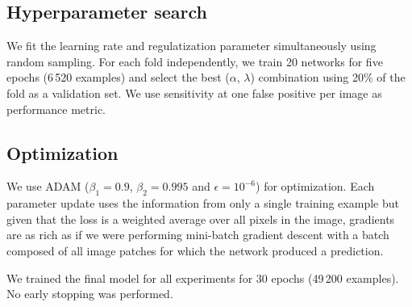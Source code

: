 \subsection{Hyperparameter search}
\label{subsec:Hyperparameters}
We fit the learning rate and regulatization parameter simultaneously using random sampling. For each fold independently, we train 20 networks for five epochs (6\,520 examples) and select the best ($\alpha$, $\lambda$) combination using 20\% of the fold as a validation set. We use sensitivity at one false positive per image as performance metric.

\subsection{Optimization}
We use ADAM ($\beta_1 = 0.9$, $\beta_2 = 0.995$ and $\epsilon = 10^{-6}$) for optimization.
Each parameter update uses the information from only a single training example but given that the loss is a weighted average over all pixels in the image, gradients are as rich as if we were performing mini-batch gradient descent with a batch composed of all image patches for which the network produced a prediction.

We trained the final model for all experiments for 30 epochs (49\,200 examples). No early stopping was performed.
